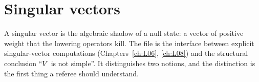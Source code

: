 \section{Singular vectors}\label{l04:sec:singular}

A singular vector is the algebraic shadow of a null state: a vector of positive weight that the
lowering operators kill. The file  is the
interface between explicit singular-vector computations (Chapters~\ref{ch:L06}, \ref{ch:L08}) and the
structural conclusion ``$V$ is not simple''. It distinguishes two notions, and the distinction is the
first thing a referee should understand.

